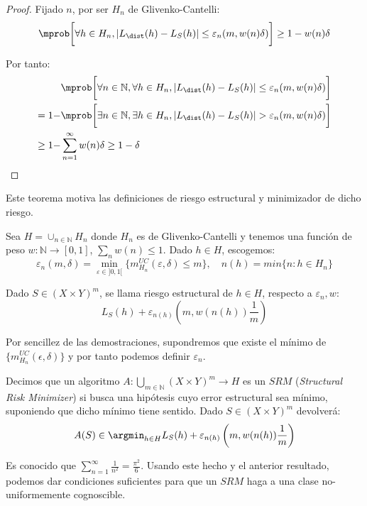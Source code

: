   \begin{proof}
   Fijado $n$, por ser $H_n$ de Glivenko-Cantelli:
   \[
     \mprob\bigg[\forall h\in H_n, |L_{\dist}(h) - L_S(h)| \le \varepsilon_n (m, w(n)\delta)\bigg] \ge 1- w(n) \delta
   \]

   Por tanto:
   \begin{align*}
          &\mprob \bigg[\forall n\in \mathbb{N}, \forall h\in H_n, |L_{\dist}(h) - L_S(h)| \le \varepsilon_n (m, w(n) \delta)\bigg]\\
   = 1 -  &\mprob\bigg[\exists n\in \mathbb{N}, \exists h\in H_n, |L_{\dist}(h) - L_S(h)| > \varepsilon_n (m, w(n) \delta)\bigg]\\
   \ge 1- &\sum_{n=1}^{\infty} w(n) \delta \ge 1-\delta
   \end{align*}
  \end{proof}

Este teorema motiva las definiciones de riesgo estructural y minimizador de dicho riesgo.

\begin{definition}
Sea $H = \cup_{n\in \mathbb{N}} H_n$ donde $H_n$ es de Glivenko-Cantelli y tenemos una función de peso
$w : \mathbb{N} \rightarrow [0,1]$, $\sum_n w(n) \le 1$. Dado $h\in H$, escogemos:
\[
  \varepsilon_n (m,\delta) = \min_{\varepsilon \in ]0,1[}\{m_{H_n}^{UC} (\varepsilon, \delta) \le m\}, \quad n(h) = min\{n: h\in H_n\}
\]

Dado $S\in (X\times Y)^m$, se llama riesgo estructural de $h\in H$, respecto a $\varepsilon_n, w$:
\[L_S(h) + \varepsilon_{n(h)} \left(m, w(n(h))\frac{1}{m}\right)\]
\end{definition}

Por sencillez de las demostraciones, supondremos que existe el mínimo de $\{m_{H_n}^{UC}(\epsilon, \delta)\}$ y por tanto
podemos definir $\varepsilon_n$.

\begin{definition}
Decimos que un algoritmo $A: \underset{m\in \mathbb{N}}{\bigcup} (X\times Y)^m \rightarrow H$ es un $SRM$ 
(\textit{Structural Risk Minimizer}) si busca una hipótesis cuyo error estructural sea mínimo, suponiendo que
dicho mínimo tiene sentido. Dado $S \in (X\times Y)^m$ devolverá:
\[
  A(S) \in \argmin_{h\in H} L_S(h) + \varepsilon_{n(h)} \left(m, w(n(h))\frac{1}{m}\right)
\]
\end{definition}

Es conocido que $\sum_{n=1}^\infty \frac{1}{n^2} = \frac{\pi^2}{6}$. Usando este hecho
y el anterior resultado, podemos dar condiciones suficientes para que un $SRM$ haga a una clase no-uniformemente
cognoscible.

